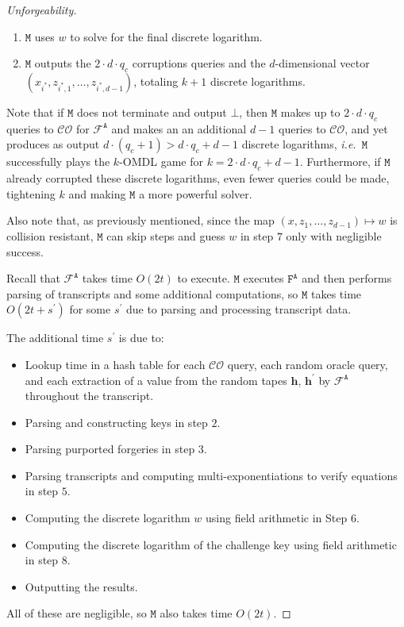 \documentclass[draft]{llncs} %
\begin{document}
\begin{proof}[Unforgeability]
\begin{enumerate}
\item $\texttt{M}$ uses $w$ to solve for the final discrete logarithm.

\item $\texttt{M}$ outputs the $2 \cdot d \cdot q_c$ corruptions queries and the $d$-dimensional vector $(x_{i^*}, z_{i^*, 1}, \ldots, z_{i^*, d-1})$, totaling $k+1$ discrete logarithms.
\end{enumerate}

Note that if $\texttt{M}$ does not terminate and output $\bot$, then $\texttt{M}$ makes up to $2\cdot d \cdot q_c$ queries to $\mathcal{CO}$ for $\mathcal{F}^{\texttt{A}}$ and makes an an additional $d-1$ queries to $\mathcal{CO}$, and yet produces as output $d \cdot (q_c + 1) > d \cdot q_c + d-1$ discrete logarithms, \textit{i.e.}\ $\texttt{M}$ successfully plays the $k$-OMDL game for $k = 2\cdot d\cdot q_c + d-1$. Furthermore,  if $\texttt{M}$ already corrupted these discrete logarithms, even fewer queries could be made, tightening $k$ and making $\texttt{M}$ a more powerful solver.

Also note that, as previously mentioned, since the map $(x, z_1, \ldots, z_{d-1}) \mapsto w$ is collision resistant, $\texttt{M}$ can skip steps and guess $w$ in step $7$ only with negligible success.

Recall that $\mathcal{F}^{\texttt{A}}$ takes time $O(2t)$ to execute. $\texttt{M}$ executes $\texttt{F}^{\texttt{A}}$ and then performs parsing of transcripts and some additional computations, so $\texttt{M}$ takes time $O(2t+s^\prime)$ for some $s^\prime$ due to parsing and processing transcript data.

The additional time $s^\prime$ is due to:
\begin{itemize}
\item Lookup time in a hash table for each $\mathcal{CO}$ query, each random oracle query, and each extraction of a value from the random tapes $\textbf{h}$, $\textbf{h}^\prime$ by $\mathcal{F}^{\texttt{A}}$ throughout the transcript.
\item Parsing and constructing keys in step $2$.
\item Parsing purported forgeries in step $3$.
\item Parsing transcripts and computing multi-exponentiations to verify equations in step $5$.
\item Computing the discrete logarithm $w$ using field arithmetic in Step $6$.
\item Computing the discrete logarithm of the challenge key using field arithmetic in step $8$.
\item Outputting the results.
\end{itemize}
All of these are negligible, so $\texttt{M}$ also takes time $O(2t)$.


\end{proof}
\end{document}
